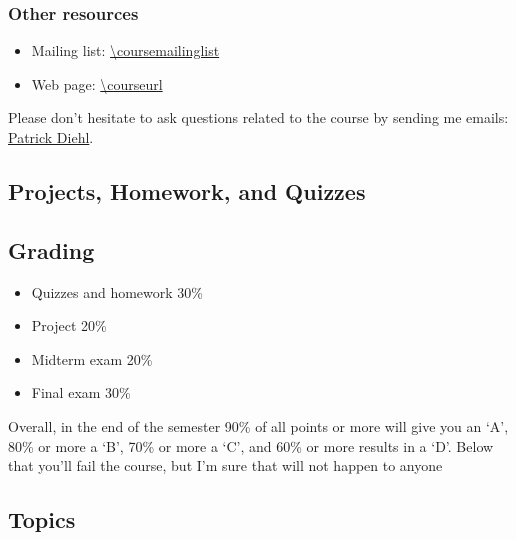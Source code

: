 \documentclass[11pt,letterpaper]{article}
\begin{document}
\subsubsection*{Other resources}

\begin{itemize}
\item Mailing list: \url{\coursemailinglist}
\item Web page: \url{\courseurl}
\end{itemize}

Please don’t hesitate to ask questions related to the course by sending me emails: \href{mailto:patrickdiehl@lsu.edu}{Patrick Diehl}. 

\subsection*{Projects, Homework, and Quizzes}

\subsection*{Grading}
\begin{itemize}
\item Quizzes and homework 30\%
\item Project 20\%
\item Midterm exam 20\%
\item Final exam 30\%
\end{itemize}
Overall, in the end of the semester 90\% of all points or more will give you an ‘A’, 80\% or more a ‘B’, 70\% or more a ‘C’, and 60\% or more results in a ‘D’. Below that you’ll fail the course, but I’m sure that will not happen to anyone

\subsection*{Topics}
\end{document}
